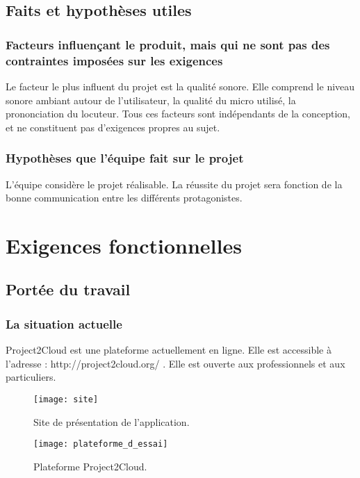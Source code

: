 		
                \section{Faits et hypothèses utiles}
			\subsection*{Facteurs influençant le produit, mais qui ne sont pas des contraintes imposées sur les exigences}
			Le facteur le plus influent du projet est la qualité sonore. Elle comprend le niveau sonore ambiant autour de l'utilisateur, la qualité du micro utilisé, la prononciation du locuteur. Tous ces facteurs sont indépendants de la conception, et ne constituent pas d'exigences propres au sujet. 
			
 			\subsection*{Hypothèses que l'équipe fait sur le projet}
			L'équipe considère le projet réalisable. La réussite du projet sera fonction de la bonne communication entre les différents protagonistes.

	\chapter{Exigences fonctionnelles}

		\section{Portée du travail}
			\subsection{La situation actuelle}
			Project2Cloud est une plateforme actuellement en ligne. Elle est accessible à l'adresse : http://project2cloud.org/ . Elle est ouverte aux professionnels et aux particuliers. 
			\begin{figure}[H] 
				\begin{center}
					\texttt{[image: site]}
					\caption{Site de présentation de l'application.}			
				\end{center}
			\end{figure}

			\begin{figure}[H] 
				\begin{center}
					\texttt{[image: plateforme\_d\_essai]}
					\caption{Plateforme Project2Cloud.}			
				\end{center}
			\end{figure}
			
